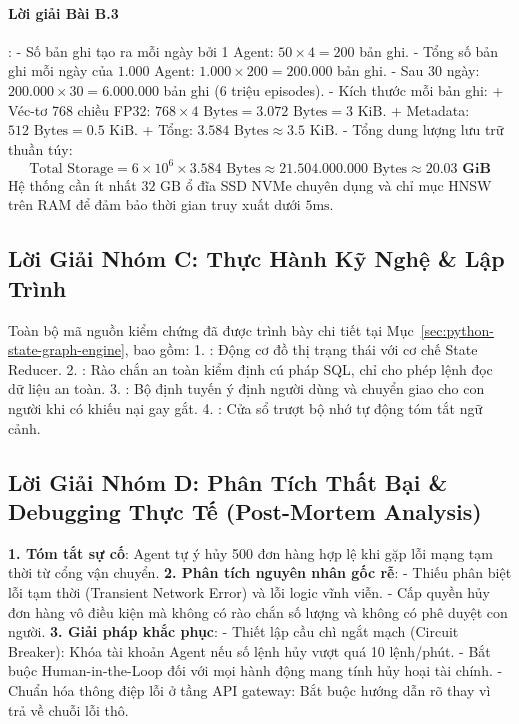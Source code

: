 \paragraph{Lời giải Bài B.3}:
- Số bản ghi tạo ra mỗi ngày bởi 1 Agent: $50 \times 4 = 200$ bản ghi.
- Tổng số bản ghi mỗi ngày của $1.000$ Agent: $1.000 \times 200 = 200.000$ bản ghi.
- Sau 30 ngày: $200.000 \times 30 = 6.000.000$ bản ghi ($6$ triệu episodes).
- Kích thước mỗi bản ghi:
  + Véc-tơ 768 chiều FP32: $768 \times 4\text{ Bytes} = 3.072\text{ Bytes} = 3\text{ KiB}$.
  + Metadata: $512\text{ Bytes} = 0.5\text{ KiB}$.
  + Tổng: $3.584\text{ Bytes} \approx 3.5\text{ KiB}$.
- Tổng dung lượng lưu trữ thuần túy:
\begin{equation*}
\text{Total Storage} = 6 \times 10^6 \times 3.584\text{ Bytes} \approx 21.504.000.000\text{ Bytes} \approx \mathbf{20.03\text{ GiB}}
\end{equation*}
Hệ thống cần ít nhất $32\text{ GB}$ ổ đĩa SSD NVMe chuyên dụng và chỉ mục HNSW trên RAM để đảm bảo thời gian truy xuất dưới $5\text{ms}$.

\subsection{Lời Giải Nhóm C: Thực Hành Kỹ Nghệ \& Lập Trình}
Toàn bộ mã nguồn kiểm chứng đã được trình bày chi tiết tại Mục~\ref{sec:python-state-graph-engine}, bao gồm:
1. : Động cơ đồ thị trạng thái với cơ chế State Reducer.
2. : Rào chắn an toàn kiểm định cú pháp SQL, chỉ cho phép lệnh đọc dữ liệu an toàn.
3. : Bộ định tuyến ý định người dùng và chuyển giao cho con người khi có khiếu nại gay gắt.
4. : Cửa sổ trượt bộ nhớ tự động tóm tắt ngữ cảnh.

\subsection{Lời Giải Nhóm D: Phân Tích Thất Bại \& Debugging Thực Tế (Post-Mortem Analysis)}

\begin{debugbox}
\textbf{1. Tóm tắt sự cố}: Agent tự ý hủy 500 đơn hàng hợp lệ khi gặp lỗi mạng tạm thời từ cổng vận chuyển.
\textbf{2. Phân tích nguyên nhân gốc rễ}:
- Thiếu phân biệt lỗi tạm thời (Transient Network Error) và lỗi logic vĩnh viễn.
- Cấp quyền hủy đơn hàng vô điều kiện mà không có rào chắn số lượng và không có phê duyệt con người.
\textbf{3. Giải pháp khắc phục}:
- Thiết lập cầu chì ngắt mạch (Circuit Breaker): Khóa tài khoản Agent nếu số lệnh hủy vượt quá 10 lệnh/phút.
- Bắt buộc Human-in-the-Loop đối với mọi hành động mang tính hủy hoại tài chính.
- Chuẩn hóa thông điệp lỗi ở tầng API gateway: Bắt buộc hướng dẫn rõ  thay vì trả về chuỗi lỗi thô.
\end{debugbox}

